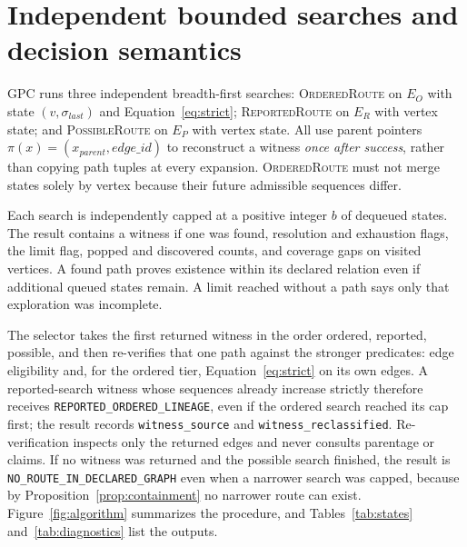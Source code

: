 \documentclass[11pt,letterpaper]{article}
\newcommand{\code}[1]{\texttt{#1}}
\newcommand{\st}[1]{\texttt{\scriptsize #1}}
\begin{document}
\section{Independent bounded searches and decision semantics}\label{sec:search}
GPC runs three independent breadth-first searches: \textup{\textsc{OrderedRoute}} on \(E_O\) with state \((v,\sigma_{last})\) and Equation~\eqref{eq:strict}; \textup{\textsc{ReportedRoute}} on \(E_R\) with vertex state; and \textup{\textsc{PossibleRoute}} on \(E_P\) with vertex state. All use parent pointers \(\pi(x)=(x_{parent},edge\_id)\) to reconstruct a witness \emph{once after success}, rather than copying path tuples at every expansion. \textup{\textsc{OrderedRoute}} must not merge states solely by vertex because their future admissible sequences differ.

Each search is independently capped at a positive integer \(b\) of dequeued states. The result contains a witness if one was found, resolution and exhaustion flags, the limit flag, popped and discovered counts, and coverage gaps on visited vertices. A found path proves existence within its declared relation even if additional queued states remain. A limit reached without a path says only that exploration was incomplete.

The selector takes the first returned witness in the order ordered, reported, possible, and then re-verifies that one path against the stronger predicates: edge eligibility and, for the ordered tier, Equation~\eqref{eq:strict} on its own edges. A reported-search witness whose sequences already increase strictly therefore receives \st{REPORTED\_ORDERED\_LINEAGE}, even if the ordered search reached its cap first; the result records \code{witness\_source} and \code{witness\_reclassified}. Re-verification inspects only the returned edges and never consults parentage or claims. If no witness was returned and the possible search finished, the result is \st{NO\_ROUTE\_IN\_DECLARED\_GRAPH} even when a narrower search was capped, because by Proposition~\ref{prop:containment} no narrower route can exist. Figure~\ref{fig:algorithm} summarizes the procedure, and Tables~\ref{tab:states} and~\ref{tab:diagnostics} list the outputs.
\end{document}
